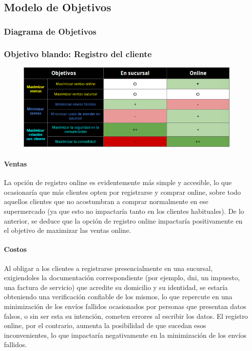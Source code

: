 \clearpage
\subsection{Modelo de Objetivos}

\subsubsection{Diagrama de Objetivos}

\newpage
\subsubsection{Objetivo blando: Registro del cliente}
\begin{figure}[H]
  \includegraphics[width=\linewidth]{images/objetivo-blando-registro-cliente.png}
\end{figure}

\paragraph{Ventas}

La opción de registro online es evidentemente más simple y accesible, lo que
ocasionaría que más clientes opten por registrarse y comprar online, sobre todo
aquellos clientes que no acostumbran a comprar normalmente en ese supermercado
(ya que esto no impactaría tanto en los clientes habituales). De lo anterior, se
deduce que la opción de registro online impactaría positivamente en el objetivo
de maximizar las ventas online.

\paragraph{Costos}

Al obligar a los clientes a registrarse presencialmente en una sucursal,
exigiendoles la documentación correspondiente (por ejemplo, dni, un impuesto,
una factura de servicio) que acredite su domicilio y su identidad, se estaría
obteniendo una verificación confiable de los mismos, lo que repercute en una
minimización de los envíos fallidos ocasionados por personas que presentan datos
falsos, o sin ser esta su intención, cometen errores al escribir los datos. El
registro online, por el contrario, aumenta la posibilidad de que sucedan esos
inconvenientes, lo que impactaría negativamente en la minimización de los envíos
fallidos.

